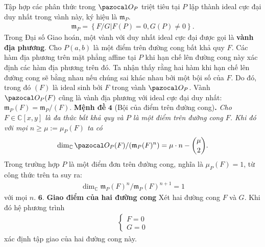 \begin{multicols}{2}
	\vskip 0.2cm
	\vskip 0.2cm
	Tập hợp các phân thức trong $\pazocal O_P$ triệt tiêu tại $P$ lập thành ideal cực đại duy nhất trong vành này, ký hiệu là $\mathfrak m_P$. 
	\begin{align*}
		\mathfrak m_P=\left\{ F/G \left|\right.  F(P)=0, G(P)\neq 0\right\}.
	\end{align*}
	Trong Đại số Giao hoán, một vành với duy nhất ideal cực đại được gọi   là \textbf{\color{duongvaotoanhoc}vành địa phương}.
	\vskip 0.1cm
	Cho $P(a,b)$ là một điểm trên đường cong bất khả quy  $F$. Các hàm địa phương trên mặt phẳng affine tại $P$ khi hạn chế lên đường cong này xác định các hàm địa phương trên đó. Ta nhận thấy rằng hai hàm khi hạn chế lên đường cong sẽ bằng nhau nếu chúng sai khác nhau bởi một bội số của $F$. Do đó, 
	\vskip 0.2cm
	\vskip 0.2cm
	trong đó $(F)$ là ideal sinh bởi $F$ trong vành $\pazocal O_P$.
	Vành $\pazocal O_P(F)$ cũng là vành địa phương với ideal cực đại duy nhất:
	$\mathfrak m_P(F)=\mathfrak m_P/(F).$
	\vskip 0.1cm
	\textbf{\color{duongvaotoanhoc}Mệnh đề} $\pmb{4}$ (Bội của điểm trên đường cong)\textbf{\color{duongvaotoanhoc}.} 
		\textit{Cho $F\in\mathbb C[x,y]$ là đa thức bất khả quy và $P$ là một điểm trên đường cong $F$. 
		Khi đó với mọi $n\geq\mu:= \mu_P(F)$  ta có}
		\setlength{\abovedisplayskip}{6pt}
		\setlength{\belowdisplayskip}{6pt} 
		\begin{align*}
			\dim_{\mathbb C}  \pazocal O_P(F)/(\mathfrak m_P(F)^n)=\mu \cdot n -
			{\mu \choose 2}.
		\end{align*}
	\vskip 0.1cm
	Trong trường hợp $P$ là một điểm đơn trên đường cong, nghĩa là $\mu_P(F)=1$, từ công thức trên ta suy ra:
	\begin{align*}
		\dim_{\mathbb C} \mathfrak m_P(F)^n/\mathfrak m_P(F)^{n+1}=1
	\end{align*}
	với mọi $n$. 
	\vskip 0.1cm
	$\pmb{6.}$ \textbf{\color{duongvaotoanhoc}Giao điểm của hai đường cong}
	\vskip 0.1cm
	Xét hai đường cong $F$  và $G$. Khi đó hệ phương trình
	\begin{align*}
		\begin{cases}
			F = 0\\
			G = 0
		\end{cases}
	\end{align*}
	xác định tập giao của hai đường cong này.  

\end{multicols}
